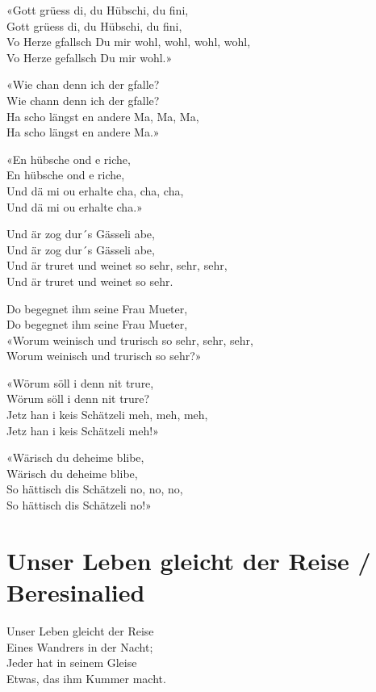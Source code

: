\documentclass[
  letterpaper,
]{scrbook}
\begin{document}
«Gott grüess di, du Hübschi, du fini,\\
Gott grüess di, du Hübschi, du fini,\\
Vo Herze gfallsch Du mir wohl, wohl, wohl, wohl,\\
Vo Herze gefallsch Du mir wohl.»

«Wie chan denn ich der gfalle?\\
Wie chann denn ich der gfalle?\\
Ha scho längst en andere Ma, Ma, Ma,\\
Ha scho längst en andere Ma.»

«En hübsche ond e riche,\\
En hübsche ond e riche,\\
Und dä mi ou erhalte cha, cha, cha,\\
Und dä mi ou erhalte cha.»

Und är zog dur´s Gässeli abe,\\
Und är zog dur´s Gässeli abe,\\
Und är truret und weinet so sehr, sehr, sehr,\\
Und är truret und weinet so sehr.

Do begegnet ihm seine Frau Mueter,\\
Do begegnet ihm seine Frau Mueter,\\
«Worum weinisch und trurisch so sehr, sehr, sehr,\\
Worum weinisch und trurisch so sehr?»

«Wörum söll i denn nit trure,\\
Wörum söll i denn nit trure?\\
Jetz han i keis Schätzeli meh, meh, meh,\\
Jetz han i keis Schätzeli meh!»

«Wärisch du deheime blibe,\\
Wärisch du deheime blibe,\\
So hättisch dis Schätzeli no, no, no,\\
So hättisch dis Schätzeli no!»

\hypertarget{unser-leben-gleicht-der-reise-beresinalied}{%
\chapter{Unser Leben gleicht der Reise /
Beresinalied}\label{unser-leben-gleicht-der-reise-beresinalied}}

Unser Leben gleicht der Reise\\
Eines Wandrers in der Nacht;\\
Jeder hat in seinem Gleise\\
Etwas, das ihm Kummer macht.
\end{document}
